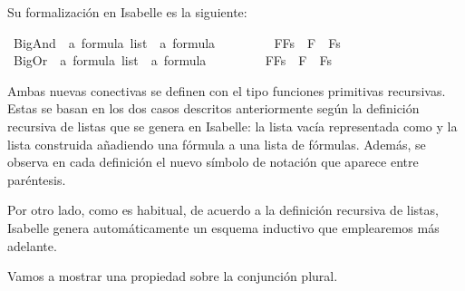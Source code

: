 \begin{isabellebody}
\begin{isamarkuptext}
  Su formalización en Isabelle es la siguiente:%
\end{isamarkuptext}\isamarkuptrue%
\isamarkupfalse%
\ BigAnd\ {\isacharcolon}{\isacharcolon}\ {\isachardoublequoteopen}{\isacharprime}a\ formula\ list\ {\isasymRightarrow}\ {\isacharprime}a\ formula{\isachardoublequoteclose}\ {\isacharparenleft}{\isachardoublequoteopen}\isactrlbold {\isasymAnd}{\isacharunderscore}{\isachardoublequoteclose}{\isacharparenright}\ \isanewline
\ \ {\isachardoublequoteopen}\isactrlbold {\isasymAnd}{\isacharbrackleft}{\isacharbrackright}\ {\isacharequal}\ {\isacharparenleft}\isactrlbold {\isasymnot}{\isasymbottom}{\isacharparenright}{\isachardoublequoteclose}\ \isanewline
{\isacharbar}\ {\isachardoublequoteopen}\isactrlbold {\isasymAnd}{\isacharparenleft}F{\isacharhash}Fs{\isacharparenright}\ {\isacharequal}\ F\ \isactrlbold {\isasymand}\ \isactrlbold {\isasymAnd}Fs{\isachardoublequoteclose}\isanewline
\isanewline
{}\isamarkupfalse%
\ BigOr\ {\isacharcolon}{\isacharcolon}\ {\isachardoublequoteopen}{\isacharprime}a\ formula\ list\ {\isasymRightarrow}\ {\isacharprime}a\ formula{\isachardoublequoteclose}\ {\isacharparenleft}{\isachardoublequoteopen}\isactrlbold {\isasymOr}{\isacharunderscore}{\isachardoublequoteclose}{\isacharparenright}\ \isanewline
\ \ {\isachardoublequoteopen}\isactrlbold {\isasymOr}{\isacharbrackleft}{\isacharbrackright}\ {\isacharequal}\ {\isasymbottom}{\isachardoublequoteclose}\ \isanewline
{\isacharbar}\ {\isachardoublequoteopen}\isactrlbold {\isasymOr}{\isacharparenleft}F{\isacharhash}Fs{\isacharparenright}\ {\isacharequal}\ F\ \isactrlbold {\isasymor}\ \isactrlbold {\isasymOr}Fs{\isachardoublequoteclose}%
\begin{isamarkuptext}%
Ambas nuevas conectivas se definen con el tipo funciones 
  primitivas recursivas. Estas se basan en los dos casos descritos
  anteriormente según la definición recursiva de listas que se genera en
  Isabelle: la lista vacía representada como \isa{{\isacharbrackleft}{\isacharbrackright}} y la lista
  construida añadiendo una fórmula a una lista de fórmulas. 
  Además, se observa en cada definición el nuevo símbolo de 
  notación que aparece entre paréntesis.

  Por otro lado, como es habitual, de acuerdo a la definición recursiva
  de listas, Isabelle genera automáticamente un esquema inductivo que 
  emplearemos más adelante.

  Vamos a mostrar una propiedad sobre la conjunción plural.


\end{isamarkuptext}
\end{isabellebody}
